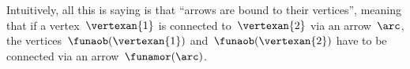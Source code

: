 \begin{ctdefinition}
\begin{center}
    \end{center}
\end{ctdefinition}


\begin{remark}
    Intuitively, all this is saying is that ``arrows are bound to their vertices'', meaning that if a vertex~$\vertexan{1}$ is connected to~$\vertexan{2}$ via an arrow~$\arc$, the vertices~$\funaob(\vertexan{1})$ and~$\funaob(\vertexan{2})$ have to be connected via an arrow~$\funamor(\arc)$.
\end{remark}


